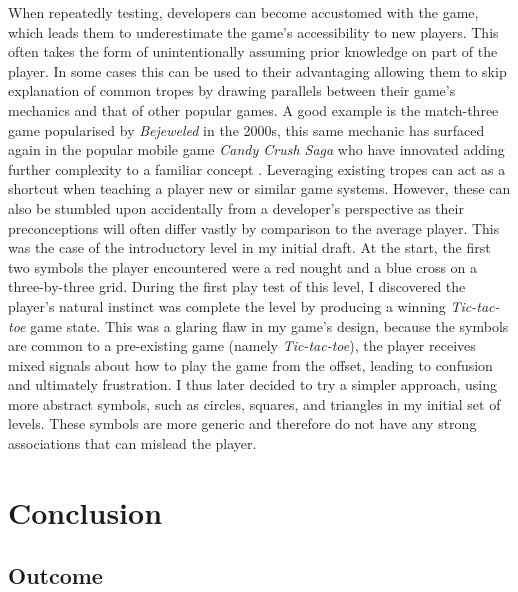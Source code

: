 \documentclass[final]{cmpreport}
\begin{document}
When repeatedly testing, developers can become accustomed with the game, which leads them to underestimate the game's accessibility to new players. This often takes the form of unintentionally assuming prior knowledge on part of the player. In some cases this can be used to their advantaging allowing them to skip explanation of common tropes by drawing parallels between their game's mechanics and that of other popular games. A good example is the match-three game popularised by \textit{Bejeweled} in the 2000s, this same mechanic has surfaced again in the popular mobile game \textit{Candy Crush Saga} who have innovated adding further complexity to a familiar concept \citep{Juul}. Leveraging existing tropes can act as a shortcut when teaching a player new or similar game systems. However, these can also be stumbled upon accidentally from a developer's perspective as their preconceptions will often differ vastly by comparison to the average player. This was the case of the introductory level in my initial draft. At the start, the first two symbols the player encountered were a red nought and a blue cross on a three-by-three grid. During the first play test of this level, I discovered the player's natural instinct was complete the level by producing a winning \emph{Tic-tac-toe} game state. This was a glaring flaw in my game's design, because the symbols are common to a pre-existing game (namely \emph{Tic-tac-toe}), the player receives mixed signals about how to play the game from the offset, leading to confusion and ultimately frustration. I thus later decided to try a simpler approach, using more abstract symbols, such as circles, squares, and triangles in my initial set of levels. These symbols are more generic and therefore do not have any strong associations that can mislead the player.

\section{Conclusion}
\subsection{Outcome}
\end{document}
